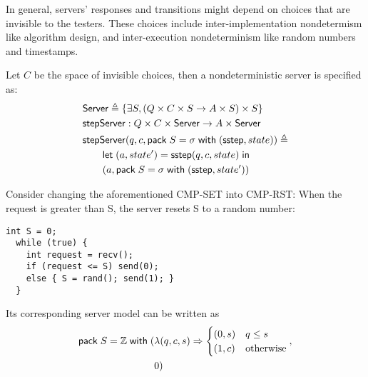 In general, servers' responses and transitions might depend on choices that are
invisible to the testers.  These choices include inter-implementation
nondetermism like algorithm design, and inter-execution nondeterminism like
random numbers and timestamps.
\begin{definition}
  \label{def:server}
  Let $C$ be the space of invisible choices, then a nondeterministic server is
  specified as:
\begin{align*}
  &\mathsf{Server}\triangleq\{\exists S,(Q \times C \times S \to A \times S) \times S\} \\
  &\mathsf{stepServer}:Q\times C \times \mathsf{Server} \to A\times \mathsf{Server} \\
  &\mathsf{stepServer}(q,c,\mathsf{pack}\;S=\sigma\;\mathsf{with}\;(\mathsf{sstep}, state))\triangleq\\
  &\qquad\mathsf{let}\;(a,state')=\mathsf{sstep}(q,c,state)\;\mathsf{in}\; \\
  &\qquad(a, \mathsf{pack}\;S=\sigma\;\mathsf{with}\;(\mathsf{sstep}, state'))
\end{align*}
\end{definition}

Consider changing the aforementioned CMP-SET into CMP-RST: When the
request is greater than \inlinec S, the server resets \inlinec S to a
random number:
\begin{lstlisting}[style=customc]
  int S = 0;
  while (true) {
    int request = recv();
    if (request <= S) send(0);
    else { S = rand(); send(1); }
  }
\end{lstlisting}
Its corresponding server model can be written as
\begin{align*}
  \mathsf{pack}\;S=\mathbb Z\;\mathsf{with}\;(&\lambda(q,c,s)\Rightarrow
      \begin{cases}
        (0,s)& q\le s\\
        (1,c)&\mathrm{otherwise}
      \end{cases}
   ,\\
    &0)
\end{align*}

